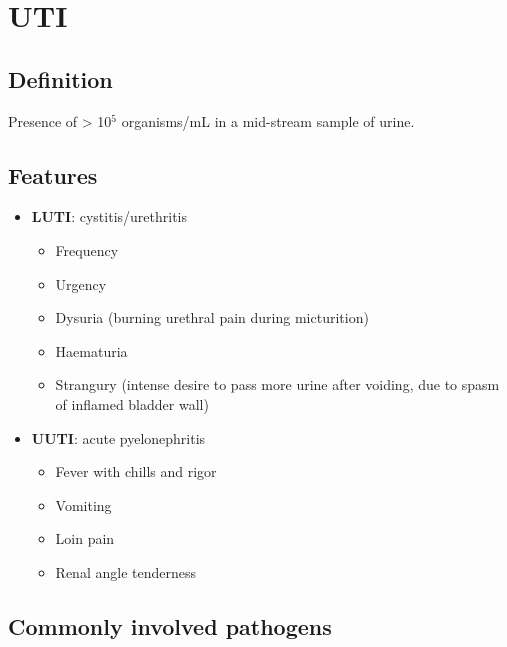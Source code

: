 \documentclass[
  12pt,
]{memoir}
\providecommand{\tightlist}{%
  \setlength{\itemsep}{0pt}\setlength{\parskip}{0pt}}
\begin{document}
\hypertarget{uti}{%
\section{UTI}\label{uti}}

\hypertarget{definition}{%
\subsection{Definition}\label{definition}}

Presence of \textgreater{} 10\(^5\) organisms/mL in a mid-stream sample
of urine.

\hypertarget{features-4}{%
\subsection{Features}\label{features-4}}

\begin{itemize}
\tightlist
\item
  \textbf{LUTI}: cystitis/urethritis

  \begin{itemize}
  \tightlist
  \item
    Frequency
  \item
    Urgency
  \item
    Dysuria (burning urethral pain during micturition)
  \item
    Haematuria
  \item
    Strangury (intense desire to pass more urine after voiding, due to
    spasm of inflamed bladder wall)
  \end{itemize}
\item
  \textbf{UUTI}: acute pyelonephritis

  \begin{itemize}
  \tightlist
  \item
    Fever with chills and rigor
  \item
    Vomiting
  \item
    Loin pain
  \item
    Renal angle tenderness
  \end{itemize}
\end{itemize}

\hypertarget{commonly-involved-pathogens}{%
\subsection{Commonly involved
pathogens}\label{commonly-involved-pathogens}}
\end{document}
